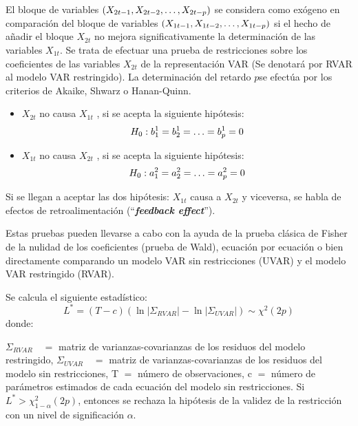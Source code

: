 El bloque de variables $(X_{2t-1},X_{2t-2},\mathellipsis ,X_{2t-p})$ se considera como ex\'{o}geno en comparaci\'{o}n del bloque de variables $(X_{1t-1}, X_{1t-2},\mathellipsis ,X_{1t-p})$ si el hecho de a\~{n}adir el bloque $X_{2t}$ no mejora significativamente la determinaci\'{o}n de las variables $X_{1t}$. Se trata de efectuar una prueba de restricciones sobre los coeficientes de las variables $X_{2t}$ de la representaci\'{o}n VAR (Se denotar\'{a} por RVAR al modelo VAR restringido). 
La determinaci\'{o}n del retardo $p $se efect\'{u}a por los criterios de Akaike, Shwarz o Hanan-Quinn. 

\begin{itemize}
\item $X_{2t}$ no causa $X_{1t}$ , si se acepta la siguiente hip\'{o}tesis:
\[
H_{0}:b_{1}^{1}=b_{2}^{1}=\mathellipsis =b_{p}^{1}=0
\]
\item $X_{1t}$ no causa $X_{2t}$ , si se acepta la siguiente hip\'{o}tesis:
\[
H_{0}:a_{1}^{2}=a_{2}^{2}=\mathellipsis =a_{p}^{2}=0
\]
\end{itemize}

Si se llegan a aceptar las dos hip\'{o}tesis: $X_{1t}$ causa a $X_{2t}$ y viceversa, se habla de efectos de retroalimentaci\'{o}n (``\textbf{\textit{feedback effect}}'').\newline 

Estas pruebas pueden llevarse a cabo con la ayuda de la prueba cl\'{a}sica de Fisher de la nulidad de los coeficientes (prueba de Wald), ecuaci\'{o}n por ecuaci\'{o}n o bien directamente comparando un modelo VAR sin restricciones (UVAR) y el modelo VAR restringido (RVAR).\newline

Se calcula el siguiente estad\'{i}stico:
\[
L^{\ast }=\left( T-c \right)(\ln \left| \Sigma_{RVAR} \right|-\ln \left| \Sigma_{UVAR} \right|)\sim \chi^{2}(2p)
\]
donde:

$\Sigma_{RVAR}\quad =$ matriz de varianzas-covarianzas de los residuos del modelo restringido,\newline
$\Sigma_{UVAR}\quad =$ matriz de varianzas-covarianzas de los residuos del modelo sin restricciones,\newline
T $=$ n\'{u}mero de observaciones,\newline
c $=$ n\'{u}mero de par\'{a}metros estimados de cada ecuaci\'{o}n del modelo sin restricciones.\newline
Si $L^{\ast }>\chi_{1-\alpha }^{2}(2p)$, entonces se rechaza la hip\'{o}tesis de la validez de la restricci\'{o}n con un nivel de significaci\'{o}n $\alpha $.\newline

